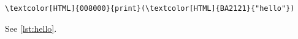 \listoflistings

\begin{listing}[htbp]
\begin{Verbatim}[commandchars=\\\{\}]
\textcolor[HTML]{008000}{print}(\textcolor[HTML]{BA2121}{"hello"})
\end{Verbatim}
\caption{A listing}
\label{lst:hello}
\end{listing}

See \cref{lst:hello}.

